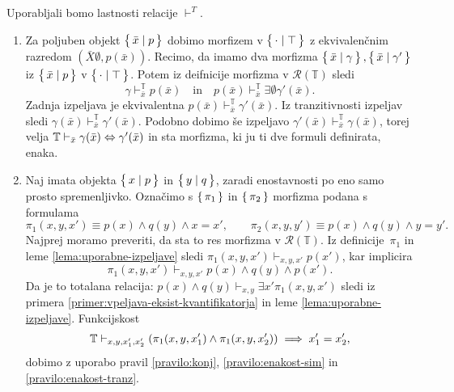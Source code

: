 \documentclass[../kategoricna_logika.tex]{subfiles}
\begin{document}
  \begin{dokaz}
    Uporabljali bomo lastnosti relacije $\vdash^T$.
    \begin{enumerate}[label=(\roman*)]
    \item Za poljuben objekt $\left\lbrace\,\bar{x} \mid p\,\right\rbrace$ dobimo morfizem v
      $\left\lbrace\,\cdot \mid \top\,\right\rbrace$ z ekvivalenčnim razredom
      $(\bar{X}\emptyset, p(\bar{x}))$.  Recimo, da imamo dva morfizma
      $\left\lbrace\,\bar{x} \mid \gamma\,\right\rbrace, \left\lbrace\,\bar{x} \mid \gamma'\,\right\rbrace$ iz
      $\left\lbrace\,\bar{x} \mid p\,\right\rbrace$ v $\left\lbrace\,\cdot \mid \top\,\right\rbrace$.  Potem iz
      deifnicije morfizma v $\mathcal{R}(\mathbb{T})$ sledi
      \[ \gamma \vdash_{\bar{x}}^{\mathbb{T}} p(\bar{x})\quad \text{in}\quad
      p(\bar{x}) \vdash_{\bar{x}}^{\mathbb{T}} \exists \emptyset \gamma'(\bar{x}).\]
      Zadnja izpeljava je ekvivalentna
      $p(\bar{x}) \vdash_{\bar{x}}^{\mathbb{T}} \gamma'(\bar{x})$.
      Iz tranzitivnosti izpeljav sledi
      $\gamma(\bar{x}) \vdash_{\bar{x}}^{\mathbb{T}}
      \gamma'(\bar{x})$.  Podobno dobimo še izpeljavo
      $\gamma'(\bar{x}) \vdash_{\bar{x}}^{\mathbb{T}} \gamma(\bar{x})
      $, torej velja
      $\mathbb{T} \vdash_{\bar{x}} \gamma(\bar{x}) \Leftrightarrow \gamma'(\bar{x})$ in sta
      morfizma, ki ju ti dve formuli definirata, enaka.
    
    \item Naj imata objekta $\left\lbrace\,x \mid p\,\right\rbrace$ in $\left\lbrace\,y \mid q\,\right\rbrace$,
      zaradi enostavnosti po eno samo prosto spremenljivko.  Označimo
      s $\left\lbrace\,\pi_1\,\right\rbrace$ in $\left\lbrace\,\pi_2\,\right\rbrace$ morfizma podana s formulama
      \[ \pi_1(x,y,x') \equiv p(x) \land q(y) \land x=x', \qquad
        \pi_2(x,y,y') \equiv p(x) \land q(y) \land y=y'.
      \]
      Najprej moramo preveriti, da sta to res morfizma v
      $\mathcal{R}(\mathbb{T})$.  Iz definicije~$\pi_1$ in leme
      \ref{lema:uporabne-izpeljave} sledi
      $\pi_1(x,y,x') \vdash_{x,y,x'} p(x')$, kar implicira
    $$\pi_1(x,y,x') \vdash_{x,y,x'} p(x) \land q(y) \land p(x').$$
    Da je to totalana relacija:
    $p(x) \land q(y) \vdash_{x,y} \exists x' \pi_1(x,y,x')$ sledi iz
    primera \ref{primer:vpeljava-eksist-kvantifikatorja} in leme
    \ref{lema:uporabne-izpeljave}.  Funkcijskost
    \[\mathbb{T} \vdash_{x,y,x_1',x_2'} (\pi_1(x,y,x_1') \land \pi_1(x,y,x_2')) \implies x_1' = x_2',\]
    dobimo z uporabo pravil \ref{pravilo:konj}, \ref{pravilo:enakost-sim}
    in \ref{pravilo:enakost-tranz}.


\end{enumerate}
\end{dokaz}
\end{document}
